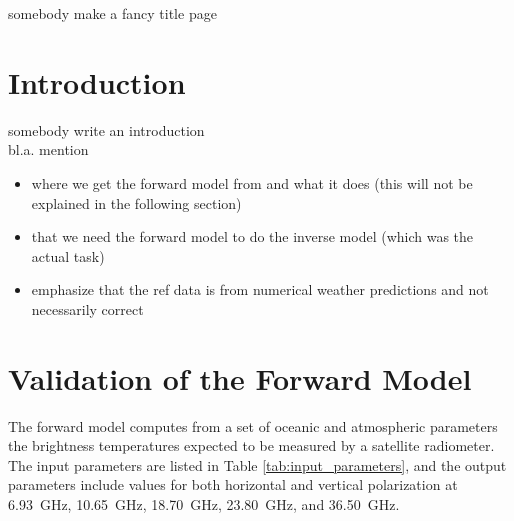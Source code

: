 \documentclass[11pt, a4paper]{article}
\begin{document}
\begin{titlepage}
\centering
{somebody make a fancy title page}
\end{titlepage}










\newpage
\section{Introduction}

somebody write an introduction \\

bl.a. mention
\begin{itemize}
\item where we get the forward model from and what it does (this will not be explained in the following section)
\item that we need the forward model to do the inverse model (which was the actual task)
\item emphasize that the ref data is from numerical weather predictions and not necessarily correct
\end{itemize}






\newpage
\section{Validation of the Forward Model}

The forward model computes from a set of oceanic and atmospheric parameters the brightness temperatures expected to be measured by a satellite radiometer. The input parameters are listed in Table \ref{tab:input_parameters}, and the output parameters include values for both horizontal and vertical polarization at \SI{6.93}{GHz}, \SI{10.65}{GHz}, \SI{18.70}{GHz}, \SI{23.80}{GHz}, and \SI{36.50}{GHz}.
\end{document}
